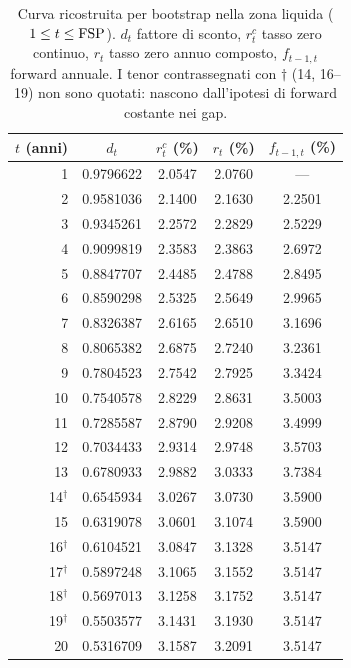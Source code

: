 \begin{table}[H]\centering\small
\caption{Curva ricostruita per bootstrap nella zona liquida ($1\le t\le\mathrm{FSP}$). $d_t$ fattore di sconto, $r^c_t$ tasso zero continuo, $r_t$ tasso zero annuo composto, $f_{t-1,t}$ forward annuale. I tenor contrassegnati con $\dagger$ (14, 16--19) non sono quotati: nascono dall'ipotesi di forward costante nei gap.}
\label{tab:curva-bootstrap}\renewcommand{\arraystretch}{1.1}
\begin{tabular}{rcccc}
\toprule
$t$ (anni) & $d_t$ & $r^c_t$ (\%) & $r_t$ (\%) & $f_{t-1,t}$ (\%)\\
\midrule
\rowcolor{rowtint}1 & 0.9796622 & 2.0547 & 2.0760 & ---\\
2 & 0.9581036 & 2.1400 & 2.1630 & 2.2501\\
\rowcolor{rowtint}3 & 0.9345261 & 2.2572 & 2.2829 & 2.5229\\
4 & 0.9099819 & 2.3583 & 2.3863 & 2.6972\\
\rowcolor{rowtint}5 & 0.8847707 & 2.4485 & 2.4788 & 2.8495\\
6 & 0.8590298 & 2.5325 & 2.5649 & 2.9965\\
\rowcolor{rowtint}7 & 0.8326387 & 2.6165 & 2.6510 & 3.1696\\
8 & 0.8065382 & 2.6875 & 2.7240 & 3.2361\\
\rowcolor{rowtint}9 & 0.7804523 & 2.7542 & 2.7925 & 3.3424\\
10 & 0.7540578 & 2.8229 & 2.8631 & 3.5003\\
\rowcolor{rowtint}11 & 0.7285587 & 2.8790 & 2.9208 & 3.4999\\
12 & 0.7034433 & 2.9314 & 2.9748 & 3.5703\\
\rowcolor{rowtint}13 & 0.6780933 & 2.9882 & 3.0333 & 3.7384\\
14$^\dagger$ & 0.6545934 & 3.0267 & 3.0730 & 3.5900\\
\rowcolor{rowtint}15 & 0.6319078 & 3.0601 & 3.1074 & 3.5900\\
16$^\dagger$ & 0.6104521 & 3.0847 & 3.1328 & 3.5147\\
\rowcolor{rowtint}17$^\dagger$ & 0.5897248 & 3.1065 & 3.1552 & 3.5147\\
18$^\dagger$ & 0.5697013 & 3.1258 & 3.1752 & 3.5147\\
\rowcolor{rowtint}19$^\dagger$ & 0.5503577 & 3.1431 & 3.1930 & 3.5147\\
20 & 0.5316709 & 3.1587 & 3.2091 & 3.5147\\
\bottomrule
\end{tabular}
\end{table}
